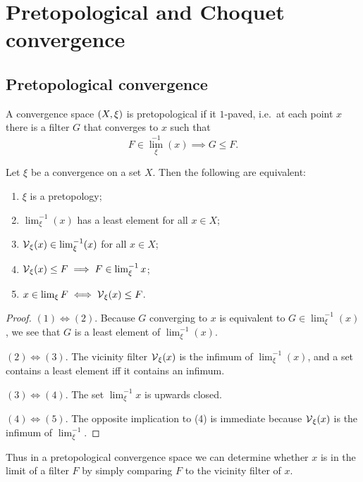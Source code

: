 \chapter{Pretopological and Choquet convergence}
\section{Pretopological convergence}
A convergence space $\left( X,\xi \right)$ is pretopological if it $1$-paved, i.e.\ at each point $x$ there is a filter $G$ that converges to $x$ such that
\[ F\in {\lim}_\xi^{-1}(x) \implies G \leq F. \]

\begin{lemma}
Let $\xi$ be a convergence on a set $X$. Then the following are equivalent:
\begin{enumerate}
\item $\xi$ is a pretopology;
\item $\lim_\xi^{-1}(x)$ has a least element for all $x\in X$;
\item $\operatorname{\mathcal{V}}_\xi(x) \in \lim_\xi^{-1}(x)$ for all $x\in X$;
\item $\operatorname{\mathcal{V}}_\xi(x) \leq F \implies F\in\lim^{-1}_\xi x$;
\item $x\in\lim_\xi F \iff \operatorname{\mathcal{V}}_\xi(x) \leq F$.
\end{enumerate}
\end{lemma}
\begin{proof}
$(1) \Leftrightarrow (2)$. Because $G$ converging to $x$ is equivalent to $G\in \lim_\xi^{-1}(x)$, we see that $G$ is a least element of $\lim_\xi^{-1}(x)$.

$(2) \Leftrightarrow (3)$. The vicinity filter $\operatorname{\mathcal{V}}_\xi(x)$ is the infimum of $\lim_\xi^{-1}(x)$, and a set contains a least element iff it contains an infimum.

$(3) \Leftrightarrow (4)$. The set $\lim^{-1}_\xi x$ is upwards closed.

$(4) \Leftrightarrow (5)$. The opposite implication to (4) is immediate because $\operatorname{\mathcal{V}}_\xi(x)$ is the infimum of $\lim^{-1}_\xi$.
\end{proof}
Thus in a pretopological convergence space we can determine whether $x$ is in the limit of a filter $F$ by simply comparing $F$ to the vicinity filter of $x$.


